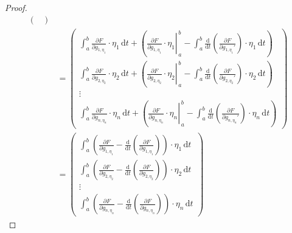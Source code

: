 \documentclass[12pt,a4paper]{article}
\begin{document}
\begin{proof}
\begin{align*}
\begin{pmatrix}
\end{pmatrix}\\
&=\begin{pmatrix}
\displaystyle\int_a^b\frac{\partial F}{\partial g_{1,\eta_1}}\cdot\eta_1\,\mathrm{d}t+\left(\left.\frac{\partial F}{\partial g_{1,\eta_1}}\cdot\eta_1\right|_{\,a}^{\,b}-\int_a^b\frac{\mathrm{d}}{\mathrm{d}t}\left(\frac{\partial F}{\partial {g_{1,\eta_1}}'}\right)\cdot{\eta_1}\,\mathrm{d}t\right)\\
\displaystyle\int_a^b\frac{\partial F}{\partial g_{2,\eta_2}}\cdot\eta_2\,\mathrm{d}t+\left(\left.\frac{\partial F}{\partial g_{2,\eta_2}}\cdot\eta_2\right|_{\,a}^{\,b}-\int_a^b\frac{\mathrm{d}}{\mathrm{d}t}\left(\frac{\partial F}{\partial {g_{2,\eta_2}}'}\right)\cdot{\eta_2}\,\mathrm{d}t\right)\\
\vdots\\
\displaystyle\int_a^b\frac{\partial F}{\partial g_{n,\eta_n}}\cdot\eta_n\,\mathrm{d}t+\left(\left.\frac{\partial F}{\partial g_{n,\eta_n}}\cdot\eta_n\right|_{\,a}^{\,b}-\int_a^b\frac{\mathrm{d}}{\mathrm{d}t}\left(\frac{\partial F}{\partial {g_{n,\eta_n}}'}\right)\cdot{\eta_n}\,\mathrm{d}t\right)
\end{pmatrix}\\
&=\begin{pmatrix}
\displaystyle\int_a^b\left(\frac{\partial F}{\partial g_{1,\eta_1}}-\frac{\mathrm{d}}{\mathrm{d}t}\left(\frac{\partial F}{\partial g_{1,\eta_1}}\right)\right)\cdot\eta_1\,\mathrm{d}t\\
\displaystyle\int_a^b\left(\frac{\partial F}{\partial g_{2,\eta_2}}-\frac{\mathrm{d}}{\mathrm{d}t}\left(\frac{\partial F}{\partial g_{2,\eta_2}}\right)\right)\cdot\eta_2\,\mathrm{d}t\\
\vdots\\
\displaystyle\int_a^b\left(\frac{\partial F}{\partial g_{n,\eta_n}}-\frac{\mathrm{d}}{\mathrm{d}t}\left(\frac{\partial F}{\partial g_{n,\eta_n}}\right)\right)\cdot\eta_n\,\mathrm{d}t
\end{pmatrix}
\end{align*}


\end{proof}
\end{document}

